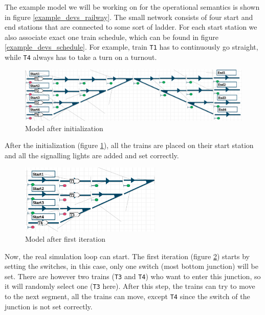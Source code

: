 \documentclass{article}
\begin{document}
The example model we will be working on for the operational semantics is shown in figure \ref{example_devs_railway}. The small network consists of four start and end stations that are connected to some sort of ladder. For each start station we also associate exact one train schedule, which can be found in figure \ref{example_devs_schedule}. For example, train \texttt{T1} has to continuously go straight, while \texttt{T4} always has to take a turn on a turnout.

\begin{figure}[H]
    \centering
    \includegraphics[width=\textwidth]{images/example_devs_after_init.png}
    \caption{Model after initialization}
    \label{example_devs_after_init}
\end{figure}

After the initialization (figure \ref{example_devs_after_init}), all the trains are placed on their start station and all the signalling lights are added and set correctly.


\begin{figure}[H]
    \centering
    \includegraphics[width=0.6\textwidth]{images/example_devs_after_first_iter.png}
    \caption{Model after first iteration}
    \label{example_devs_after_first_iter}
\end{figure}

Now, the real simulation loop can start. The first iteration (figure \ref{example_devs_after_first_iter}) starts by setting the switches, in this case, only one switch (most bottom junction) will be set. There are however two trains (\texttt{T3} and \texttt{T4}) who want to enter this junction, so it will randomly select one (\texttt{T3} here). After this step, the trains can try to move to the next segment, all the trains can move, except \texttt{T4} since the switch of the junction is not set correctly.
\end{document}
